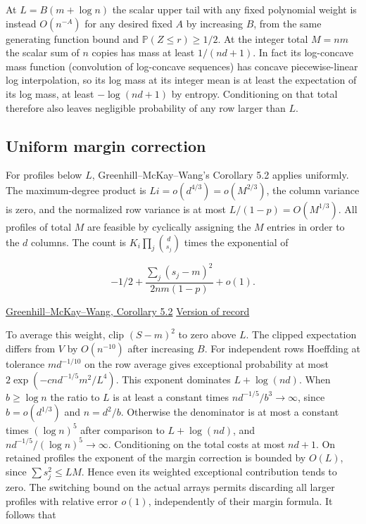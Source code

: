 At $L=B(m+\log n)$ the scalar upper tail with any fixed polynomial weight is instead $O(n^{-A})$ for any desired fixed $A$ by increasing $B$, from the same generating function bound and $\mathbb P(Z\le r)\ge1/2$. At the integer total $M=nm$ the scalar sum of $n$ copies has mass at least $1/(nd+1)$. In fact its log-concave mass function (convolution of log-concave sequences) has concave piecewise-linear log interpolation, so its log mass at its integer mean is at least the expectation of its log mass, at least $-\log(nd+1)$ by entropy. Conditioning on that total therefore also leaves negligible probability of any row larger than $L$.

\subsection{Uniform margin correction}

For profiles below $L$, Greenhill--McKay--Wang's Corollary 5.2 applies uniformly. The maximum-degree product is $Li=o(d^{4/3})=o(M^{2/3})$, the column variance is zero, and the normalized row variance is at most $L/(1-p)=O(M^{1/3})$. All profiles of total $M$ are feasible by cyclically assigning the $M$ entries in order to the $d$ columns. The count is $K_i\prod_j\binom d{s_j}$ times the exponential of

\begin{equation*}
-1/2+\frac{\sum_j(s_j-m)^2}{2nm(1-p)}+o(1).
\end{equation*}

\href{https://web.maths.unsw.edu.au/~csg/papers/irregular-final.pdf#page=33}{Greenhill--McKay--Wang, Corollary 5.2} \enspace \href{https://doi.org/10.1016/j.jcta.2005.03.005}{Version of record}

To average this weight, clip $(S-m)^2$ to zero above $L$. The clipped expectation differs from $V$ by $O(n^{-10})$ after increasing $B$. For independent rows Hoeffding at tolerance $m d^{-1/10}$ on the row average gives exceptional probability at most $2\exp(-c n d^{-1/5}m^2/L^4)$. This exponent dominates $L+\log(nd)$. When $b\ge\log n$ the ratio to $L$ is at least a constant times $n d^{-1/5}/b^3\to\infty$, since $b=o(d^{1/3})$ and $n=d^2/b$. Otherwise the denominator is at most a constant times $(\log n)^5$ after comparison to $L+\log(nd)$, and $n d^{-1/5}/(\log n)^5\to\infty$. Conditioning on the total costs at most $nd+1$. On retained profiles the exponent of the margin correction is bounded by $O(L)$, since $\sum s_j^2\le LM$. Hence even its weighted exceptional contribution tends to zero. The switching bound on the actual arrays permits discarding all larger profiles with relative error $o(1)$, independently of their margin formula. It follows that

